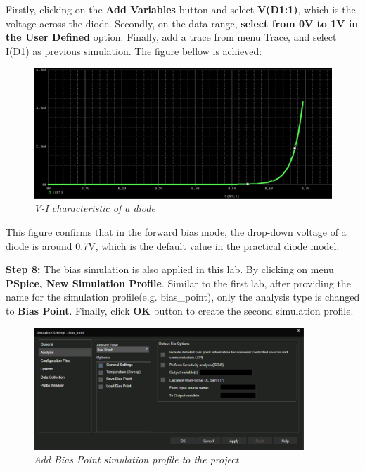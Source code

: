 Firstly, clicking on the \textbf{Add Variables} button and select \textbf{V(D1:1)}, which is the voltage across the diode. Secondly, on the data range, \textbf{select from 0V to 1V in the User Defined} option. Finally, add a trace from menu Trace, and select I(D1) as previous simulation. The figure bellow is achieved:

\begin{figure}[!htp]
    \centering
    \includegraphics[width=5.5in]{source/picture/bai_2/diode_15.PNG}
    \caption{\textit{V-I characteristic of a diode}}
    \label{bai2_pic18c}
\end{figure}

This figure confirms that in the forward bias mode, the drop-down voltage of a diode is around 0.7V, which is the default value in the practical diode model.

\textbf{Step 8: } The bias simulation is also applied in this lab. By clicking on menu \textbf{PSpice, New Simulation Profile}. Similar to the first lab, after providing the name for the simulation profile(e.g. bias\_point), only the analysis type is changed to \textbf{Bias Point}. Finally, click \textbf{OK} button to create the second simulation profile.
\newpage
\begin{figure}[!htp]
    \centering
    \includegraphics[width=4in]{source/picture/bai_2/diode_4.PNG}
    \caption{\textit{Add Bias Point simulation profile to the project}}
    \label{bai2_pic18d}
\end{figure}

